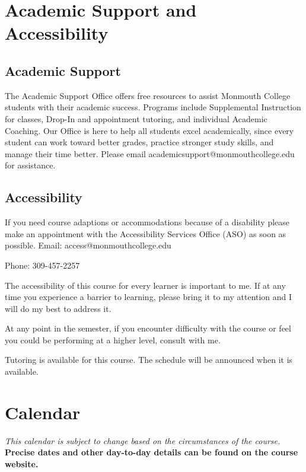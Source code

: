 \documentclass[10pt]{article}
\begin{document}
\section{Academic Support and Accessibility}

\subsection*{Academic Support}

The Academic Support Office offers free resources to assist Monmouth College students with their academic success. Programs include Supplemental Instruction for classes, Drop-In and appointment tutoring, and individual Academic Coaching. Our Office is here to help all students excel academically, since every student can work toward better grades, practice stronger study skills, and manage their time better. Please email academicsupport@monmouthcollege.edu for assistance.

\subsection*{Accessibility}

If you need course adaptions or accommodations because of a disability please make an appointment with the Accessibility Services Office (ASO) as soon as possible. Email: access@monmouthcollege.edu

Phone: 309-457-2257


The accessibility of this course for every learner is important to me. If at any time you experience a barrier to learning, please bring it to my attention and I will do my best to address it.

At any point in the semester, if you encounter difficulty with the course or feel you could be performing at a higher level, consult with me.

Tutoring is available for this course. The schedule will be announced when it is available.


\section{Calendar}

\textit{This calendar is subject to change based on the circumstances of the course.} \textbf{Precise dates and other day-to-day details can be found on the course website.}
\end{document}
